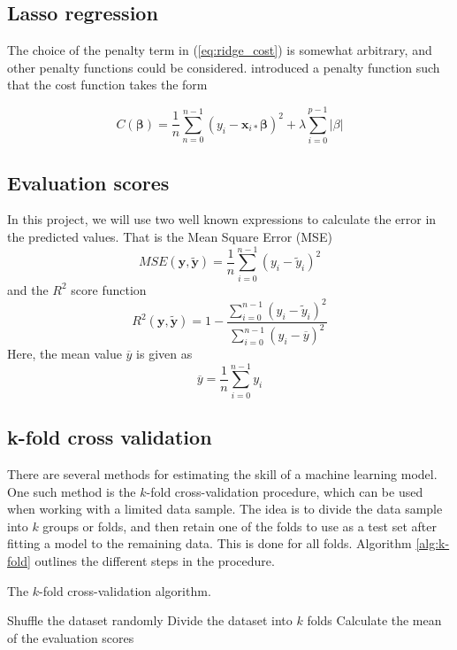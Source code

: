\subsection{Lasso regression}
The choice of the penalty term in (\ref{eq:ridge_cost}) is somewhat arbitrary, and other penalty functions could be considered. \cite{tibshirani1996lasso} introduced a penalty function such that the cost function takes the form

\begin{equation*}
C(\boldsymbol{\beta})
= \frac{1}{n}\sum_{n=0}^{n-1} \left(y_i-\boldsymbol{x}_{i*}\boldsymbol{\beta}\right)^2 + \lambda \sum_{i=0}^{p-1}\left|\beta\right|
\end{equation*}

\subsection{Evaluation scores}
In this project, we will use two well known expressions to calculate the error in the predicted values. That is the Mean Square Error (MSE)
\begin{equation}\label{eq:mse}
	MSE(\boldsymbol{y},\boldsymbol{\tilde{y}}) = \frac{1}{n} \sum_{i=0}^{n-1}\left(y_i-\tilde{y}_i\right)^2
\end{equation}
and the $R^2$ score function
\begin{equation}\label{eq:r2}
	R^2(\boldsymbol{y},\boldsymbol{\tilde{y}}) = 1- \frac{\sum_{i=0}^{n-1}\left(y_i-\tilde{y}_i\right)^2}{\sum_{i=0}^{n-1}\left(y_i-\overline{y}\right)^2}
\end{equation}
Here, the mean value $\overline{y}$ is given as
\begin{equation*}
	\overline{y}=\frac{1}{n}\sum_{i=0}^{n-1}y_i
\end{equation*}

\subsection{k-fold cross validation}
There are several methods for estimating the skill of a machine learning model. One such method is the $k$-fold cross-validation procedure, which can be used when working with a limited data sample. The idea is to divide the data sample into $k$ groups or folds, and then retain one of the folds to use as a test set after fitting a model to the remaining data. This is done for all folds. Algorithm \ref{alg:k-fold} outlines the different steps in the procedure.

\begin{algorithm}[htbp]\caption{The $k$-fold cross-validation algorithm.}\label{alg:k-fold}
	\SetAlgoLined
	\BlankLine
	\BlankLine
	Shuffle the dataset randomly\;
	Divide the dataset into $k$ folds\;
	Calculate the mean of the evaluation scores\;
	\BlankLine
	\BlankLine
\end{algorithm}

